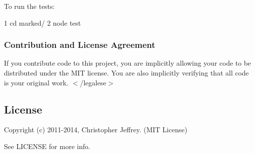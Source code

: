 To run the tests\+:


\begin{DoxyCode}
1 cd marked/
2 node test
\end{DoxyCode}


\subsubsection*{Contribution and License Agreement}

If you contribute code to this project, you are implicitly allowing your code to be distributed under the M\+I\+T license. You are also implicitly verifying that all code is your original work. {\ttfamily $<$/legalese$>$}

\subsection*{License}

Copyright (c) 2011-\/2014, Christopher Jeffrey. (M\+I\+T License)

See L\+I\+C\+E\+N\+S\+E for more info. 